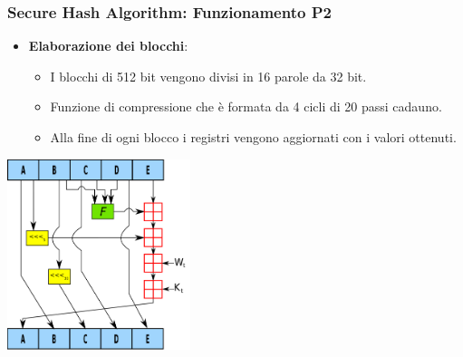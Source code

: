 \begin{frame}
\frametitle{Secure Hash Algorithm: Funzionamento P2}
\begin{itemize}
    \item \textbf{Elaborazione dei blocchi}: 
    \begin{itemize}
        \item I blocchi di 512 bit vengono divisi in 16 parole da 32 bit.
        \item Funzione di compressione che è formata da 4 cicli di 20 passi cadauno.
        \item Alla fine di ogni blocco i registri vengono aggiornati con i valori ottenuti.
    \end{itemize}
\end{itemize}
\begin{center}
    \includegraphics[width=0.4\textwidth]{img/1-img/SHA-1.png}
\end{center}
\end{frame}